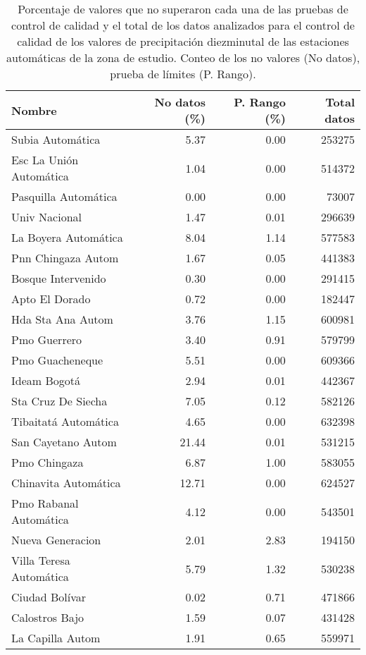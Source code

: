 \begin{table}[H]
\begin{center}


\caption{Porcentaje de valores que no superaron cada una de las pruebas de control de calidad y el total de los datos analizados para el control de calidad de los valores de precipitación diezminutal de las estaciones automáticas de la zona de estudio. Conteo de los no valores (No datos), prueba de límites (P. Rango).}
\label{tabla:val_precipitacion}
\begin{tabular}{lrrr}
\toprule
      Nombre &  No datos (\%) &  P. Rango (\%) & Total datos \\
\midrule
         Subia Automática &      5.37 &      0.00 &        253275 \\
 Esc La Unión Automática &      1.04 &      0.00 &        514372 \\
    Pasquilla Automática &      0.00 &      0.00 &         73007 \\
           Univ Nacional &      1.47 &      0.01 &        296639 \\
    La Boyera Automática &      8.04 &      1.14 &        577583 \\
      Pnn Chingaza Autom &      1.67 &      0.05 &        441383 \\
      Bosque Intervenido &      0.30 &      0.00 &        291415 \\
          Apto El Dorado &      0.72 &      0.00 &        182447 \\
       Hda Sta Ana Autom &      3.76 &      1.15 &        600981 \\
            Pmo Guerrero &      3.40 &      0.91 &        579799 \\
         Pmo Guacheneque &      5.51 &      0.00 &        609366 \\
            Ideam Bogotá &      2.94 &      0.01 &        442367 \\
      Sta Cruz De Siecha &      7.05 &      0.12 &        582126 \\
    Tibaitatá Automática &      4.65 &      0.00 &        632398 \\
      San Cayetano Autom &     21.44 &      0.01 &        531215 \\
            Pmo Chingaza &      6.87 &      1.00 &        583055 \\
    Chinavita Automática &     12.71 &      0.00 &        624527 \\
  Pmo Rabanal Automática &      4.12 &      0.00 &        543501 \\
        Nueva Generacion &      2.01 &      2.83 &        194150 \\
 Villa Teresa Automática &      5.79 &      1.32 &        530238 \\
          Ciudad Bolívar &      0.02 &      0.71 &        471866 \\
          Calostros Bajo &      1.59 &      0.07 &        431428 \\
        La Capilla Autom &      1.91 &      0.65 &        559971 \\
\bottomrule
\end{tabular}
\end{center}
\end{table}

